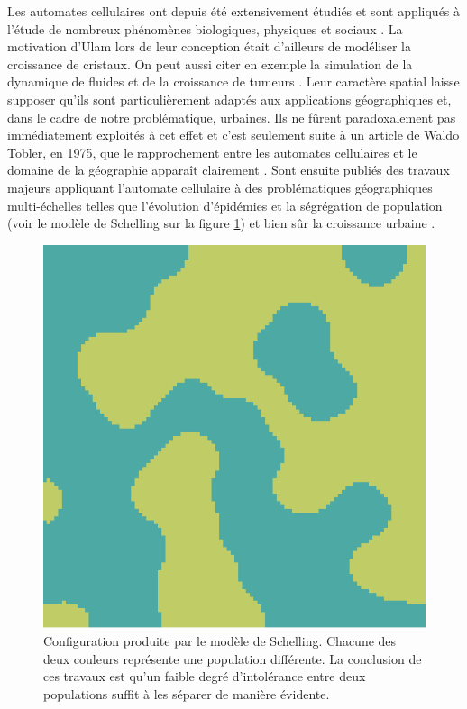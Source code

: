 \documentclass[10pt]{article}
\begin{document}
Les automates cellulaires ont depuis été extensivement étudiés et sont
appliqués à l'étude de nombreux phénomènes biologiques, physiques et
sociaux \cite{Ganguly2003}. La motivation d'Ulam lors de leur
conception était d'ailleurs de modéliser la croissance de cristaux. On
peut aussi citer en exemple la simulation de la dynamique de fluides
\cite{Frisch1986} et de la croissance de tumeurs
\cite{Kansal2000}. Leur caractère spatial laisse supposer qu'ils sont
particulièrement adaptés aux applications géographiques et, dans le
cadre de notre problématique, urbaines. Ils ne fûrent paradoxalement
pas immédiatement exploités à cet effet et c'est seulement suite à un
article de Waldo Tobler, en 1975, que le rapprochement entre les
automates cellulaires et le domaine de la géographie apparaît
clairement \cite{Tobler1975}. Sont ensuite publiés des travaux majeurs
appliquant l'automate cellulaire à des problématiques géographiques
multi-échelles telles que l'évolution d'épidémies \cite{Fu2003} et la
ségrégation de population \cite{Schelling1969} (voir le modèle de
Schelling sur la figure \ref{fig:schelling}) et bien sûr la croissance
urbaine \cite{Batty1997,Stevens2007}.

\begin{figure}[H]
  \centering
  \includegraphics[width=.5\linewidth]{images/schelling.png}
  \caption{Configuration produite par le modèle de Schelling. Chacune
    des deux couleurs représente une population différente. La
    conclusion de ces travaux est qu'un faible degré d'intolérance
    entre deux populations suffit à les séparer de manière évidente.}
  \label{fig:schelling}
\end{figure}
\end{document}
